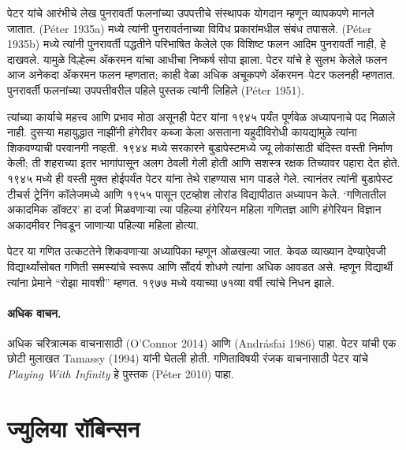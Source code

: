 पेटर यांचे आरंभीचे लेख पुनरावर्ती फलनांच्या उपपत्तीचे संस्थापक योगदान म्हणून व्यापकपणे मानले जातात. (P{\'e}ter 1935a) मध्ये त्यांनी पुनरावर्तनाच्या विविध प्रकारांमधील संबंध तपासले. (P\'eter 1935b) मध्ये त्यांनी पुनरावर्ती पद्धतीने परिभाषित केलेले एक विशिष्ट फलन आदिम पुनरावर्ती नाही, हे दाखवले. यामुळे विल्हेल्म ॲकरमन यांचा आधीचा निष्कर्ष सोपा झाला. पेटर यांचे हे सुलभ केलेले फलन आज अनेकदा ॲकरमन फलन म्हणतात; काही वेळा अधिक अचूकपणे ॲकरमन–पेटर फलनही म्हणतात. पुनरावर्ती फलनांच्या उपपत्तीवरील पहिले पुस्तक त्यांनी लिहिले (P\'eter 1951).

त्यांच्या कार्याचे महत्त्व आणि प्रभाव मोठा असूनही पेटर यांना १९४५ पर्यंत पूर्णवेळ अध्यापनाचे पद मिळाले नाही. दुसऱ्या महायुद्धात नाझींनी हंगेरीवर कब्जा केला असताना यहुदीविरोधी कायद्यांमुळे त्यांना शिकवण्याची परवानगी नव्हती. १९४४ मध्ये सरकारने बुडापेस्टमध्ये ज्यू लोकांसाठी बंदिस्त वस्ती निर्माण केली; ती शहराच्या इतर भागांपासून अलग ठेवली गेली होती आणि सशस्त्र रक्षक तिच्यावर पहारा देत होते. १९४५ मध्ये ही वस्ती मुक्त होईपर्यंत पेटर यांना तेथे राहण्यास भाग पाडले गेले. त्यानंतर त्यांनी बुडापेस्ट टीचर्स ट्रेनिंग कॉलेजमध्ये आणि १९५५ पासून एटव्होश लोरांड विद्यापीठात अध्यापन केले. ‘गणितातील अकादमिक डॉक्टर’ हा दर्जा मिळवणाऱ्या त्या पहिल्या हंगेरियन महिला गणितज्ञ आणि हंगेरियन विज्ञान अकादमीवर निवडून जाणाऱ्या पहिल्या महिला होत्या.

पेटर या गणित उत्कटतेने शिकवणाऱ्या अध्यापिका म्हणून ओळखल्या जात. केवळ व्याख्यान देण्याऐवजी विद्यार्थ्यांसोबत गणिती समस्यांचे स्वरूप आणि सौंदर्य शोधणे त्यांना अधिक आवडत असे. म्हणून विद्यार्थी त्यांना प्रेमाने “रोझा मावशी” म्हणत. १९७७ मध्ये वयाच्या ७१व्या वर्षी त्यांचे निधन झाले.

\paragraph{अधिक वाचन.}
अधिक चरित्रात्मक वाचनासाठी (O'Connor 2014) आणि (Andr\'asfai 1986) पाहा. पेटर यांची एक छोटी मुलाखत Tamassy (1994) यांनी घेतली होती. गणिताविषयी रंजक वाचनासाठी पेटर यांचे \emph{Playing With Infinity} हे पुस्तक (P\'eter 2010) पाहा.












\section{ज्युलिया रॉबिन्सन}\label{his:bio:rob:sec}



